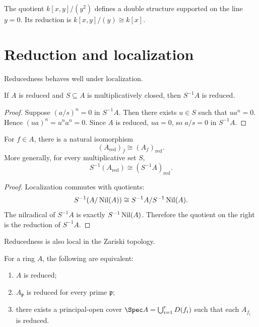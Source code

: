 \begin{example}\label{ex:vi10-expand-02}
The quotient $k[x,y]/(y^2)$ defines a double structure supported on the line $y=0$.  Its reduction is $k[x,y]/(y)\cong k[x]$.
\end{example}
\section{Reduction and localization}

Reducedness behaves well under localization.

\begin{proposition}
If $A$ is reduced and $S\subseteq A$ is multiplicatively closed, then $S^{-1}A$ is reduced.
\end{proposition}

\begin{proof}
Suppose $(a/s)^n=0$ in $S^{-1}A$.  Then there exists $u\in S$ such that
$ua^n=0$.  Hence $(ua)^n=u^n a^n=0$.  Since $A$ is reduced, $ua=0$, so $a/s=0$ in
$S^{-1}A$.
\end{proof}

\begin{theorem}
For $f\in A$, there is a natural isomorphism
\[
(A_{\mathrm{red}})_{\bar f}
\cong
(A_f)_{\mathrm{red}}.
\]
More generally, for every multiplicative set $S$,
\[
S^{-1}(A_{\mathrm{red}})\cong (S^{-1}A)_{\mathrm{red}}.
\]
\end{theorem}

\begin{proof}
Localization commutes with quotients:
\[
S^{-1}(A/\operatorname{Nil}(A))
\cong
S^{-1}A/S^{-1}\operatorname{Nil}(A).
\]
The nilradical of $S^{-1}A$ is exactly $S^{-1}\operatorname{Nil}(A)$.  Therefore the quotient on the
right is the reduction of $S^{-1}A$.
\end{proof}



Reducedness is also local in the Zariski topology.

\begin{theorem}
For a ring $A$, the following are equivalent:
\begin{enumerate}
\item $A$ is reduced;
\item $A_{\mathfrak p}$ is reduced for every prime $\mathfrak p$;
\item there exists a principal-open cover
      $\Spec A=\bigcup_{i=1}^r D(f_i)$ such that each $A_{f_i}$ is reduced.
\end{enumerate}
\end{theorem}

